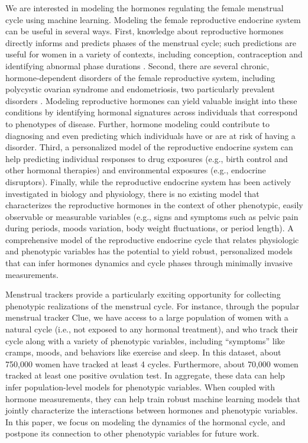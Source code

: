 \documentclass{article}
\begin{document}
We are interested in modeling the hormones regulating the female menstrual cycle using machine learning. Modeling the female reproductive endocrine system can be useful in several ways. First, knowledge about reproductive hormones directly informs and predicts phases of the menstrual cycle; such predictions are useful for women in a variety of contexts, including conception, contraception and identifying abnormal phase durations \citep{j-Jordan1994, j-Crawford2017}. Second, there are several chronic, hormone-dependent disorders of the female reproductive system, including polycystic ovarian syndrome and endometriosis, two particularly prevalent disorders \citep{j-Carmina1999,j-Giudice2010,j-Barbosa2011}. Modeling reproductive hormones can yield valuable insight into these conditions by identifying hormonal signatures across individuals that correspond to phenotypes of disease. Further, hormone modeling could contribute to diagnosing and even predicting which individuals have or are at risk of having a disorder. Third, a personalized model of the reproductive endocrine system can help predicting individual responses to drug exposures (e.g., birth control and other hormonal therapies) and environmental exposures (e.g., endocrine disruptors). Finally, while the reproductive endocrine system has been actively investigated in biology and physiology, there is no existing model that characterizes the reproductive hormones in the context of other phenotypic, easily observable or measurable variables (e.g., signs and symptoms such as pelvic pain during periods, moods variation, body weight fluctuations, or period length). A comprehensive model of the reproductive endocrine cycle that relates physiologic and phenotypic variables has the potential to yield robust, personalized models that can infer hormones dynamics and cycle phases through minimally invasive measurements.

Menstrual trackers provide a particularly exciting opportunity for collecting
phenotypic realizations of the menstrual cycle. For instance, through the
popular menstrual tracker Clue, we have access to a large population of women
with a natural cycle (i.e., not exposed to any hormonal treatment), and who
track their cycle along with a variety of phenotypic variables, including
``symptoms'' like cramps, moods, and behaviors like exercise and sleep. In this
dataset, about 750,000 women have tracked at least 4 cycles. Furthermore, about
70,000 women tracked at least one positive ovulation test. In aggregate, these
data can help infer population-level models for phenotypic variables. When
coupled with hormone measurements, they can help train robust machine learning
models that jointly characterize the interactions between hormones and
phenotypic variables. In this paper, we focus on modeling the dynamics of the
hormonal cycle, and postpone its connection to other phenotypic variables for
future work. 
\end{document}
